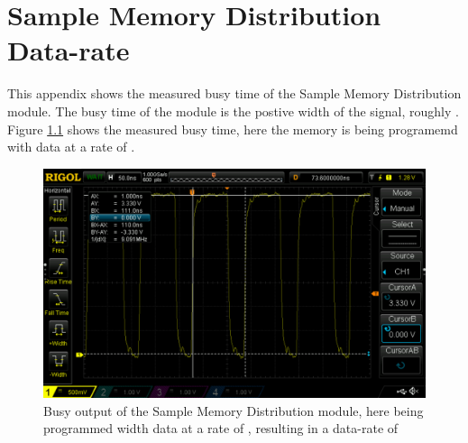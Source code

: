 \chapter{Sample Memory Distribution Data-rate} \label{App:MDIST_BUSY}
This appendix shows the measured busy time of the Sample Memory Distribution module. The busy time of the module is the postive width of the signal, roughly . Figure \ref{fig_App_MDIST_BUSY} shows the measured busy time, here the memory is being programemd with data at a rate of .

\begin{figure}[H]
    \centering
    \includegraphics[clip, trim=0 0 0 0,width=1.0\textwidth]{Appendix/Figures/MDIST_BUSY.pdf}
    \caption{Busy output of the Sample Memory Distribution module, here being programmed width data at a rate of , resulting in a data-rate of }
    \label{fig_App_MDIST_BUSY}
\end{figure}
